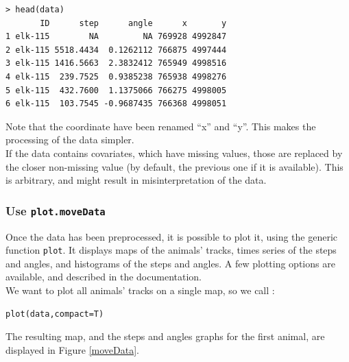 \documentclass[]{article}
\begin{document}
\begin{lstlisting}
> head(data)
       ID      step      angle      x       y
1 elk-115        NA         NA 769928 4992847
2 elk-115 5518.4434  0.1262112 766875 4997444
3 elk-115 1416.5663  2.3832412 765949 4998516
4 elk-115  239.7525  0.9385238 765938 4998276
5 elk-115  432.7600  1.1375066 766275 4998005
6 elk-115  103.7545 -0.9687435 766368 4998051
\end{lstlisting}

Note that the coordinate have been renamed ``x'' and ``y''. This makes the processing of the data simpler.\\

If the data contains covariates, which have missing values, those are replaced by the closer non-missing value (by default, the previous one if it is available). This is arbitrary, and might result in misinterpretation of the data.

\subsubsection{Use \texttt{plot.moveData}}
Once the data has been preprocessed, it is possible to plot it, using the generic function \texttt{plot}. It displays maps of the animals' tracks, times series of the steps and angles, and histograms of the steps and angles. A few plotting options are available, and described in the documentation.\\

\noindent We want to plot all animals' tracks on a single map, so we call :

\begin{lstlisting}
plot(data,compact=T)
\end{lstlisting}

The resulting map, and the steps and angles graphs for the first animal, are displayed in Figure \ref{moveData}.
\end{document}

